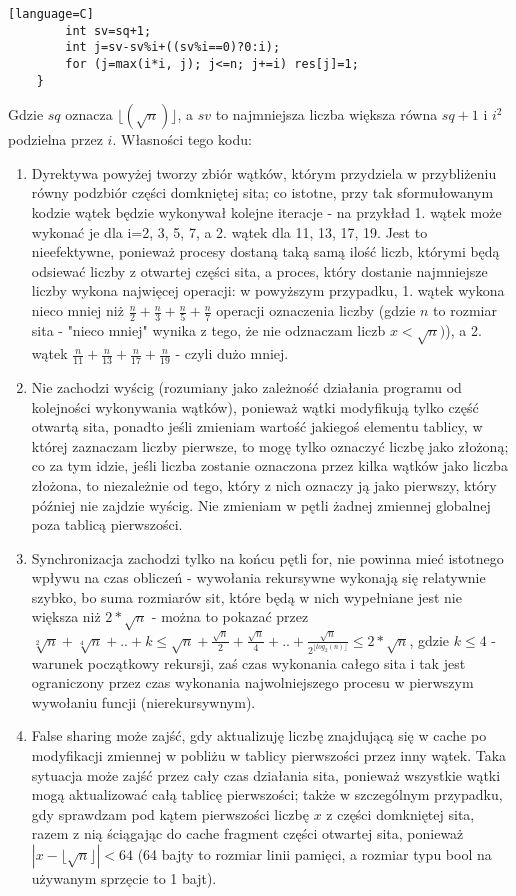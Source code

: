 \documentclass[12pt]{article}
\begin{document}
\begin {enumerate}
\begin{lstlisting}[style=mystyle, caption= Sito funkcyjne ze static schedulingiem][language=C]
		int sv=sq+1;
		int j=sv-sv%i+((sv%i==0)?0:i);
		for (j=max(i*i, j); j<=n; j+=i) res[j]=1;
	}
	\end{lstlisting}
	Gdzie \(sq\) oznacza \(\lfloor(\sqrt{n})\rfloor\), a \(sv\) to najmniejsza liczba większa równa \(sq+1\) i \(i^2\) podzielna przez \(i\). Własności tego kodu:
	\begin{enumerate}
		\item Dyrektywa powyżej tworzy zbiór wątków, którym przydziela w przybliżeniu równy podzbiór części domkniętej sita; co istotne, przy tak sformułowanym kodzie wątek będzie wykonywał kolejne iteracje - na przykład 1. wątek może wykonać je dla i=2, 3, 5, 7, a 2. wątek dla 11, 13, 17, 19. Jest to nieefektywne, ponieważ procesy dostaną taką samą ilość liczb, którymi będą odsiewać liczby z otwartej części sita, a proces, który dostanie najmniejsze liczby wykona najwięcej operacji: w powyższym przypadku, 1. wątek wykona nieco mniej niż \(\frac{n}{2}+\frac{n}{3}+\frac{n}{5}+\frac{n}{7}\) operacji oznaczenia liczby (gdzie \(n\) to rozmiar sita - "nieco mniej" wynika z tego, że nie odznaczam liczb \(x<\sqrt{n})\)), a 2. wątek \(\frac{n}{11}+\frac{n}{13}+\frac{n}{17}+\frac{n}{19}\) - czyli dużo mniej.
		\item Nie zachodzi wyścig (rozumiany jako zależność działania programu od kolejności wykonywania wątków), ponieważ wątki modyfikują tylko część otwartą sita, ponadto jeśli zmieniam wartość jakiegoś elementu tablicy, w której zaznaczam liczby pierwsze, to mogę tylko oznaczyć liczbę jako złożoną; co za tym idzie, jeśli liczba zostanie oznaczona przez kilka wątków jako liczba złożona, to niezależnie od tego, który z nich oznaczy ją jako pierwszy, który później nie zajdzie wyścig. Nie zmieniam w pętli żadnej zmiennej globalnej poza tablicą pierwszości.
		\item Synchronizacja zachodzi tylko na końcu pętli for, nie powinna mieć istotnego wpływu na czas obliczeń - wywołania rekursywne wykonają się relatywnie szybko, bo suma rozmiarów sit, które będą w nich wypełniane jest nie większa niż \(2*\sqrt{n}\) - można to pokazać przez \(\sqrt[2]{n}+\sqrt[4]{n}+..+k\le\sqrt{n}+\frac{\sqrt{n}}{2}+\frac{\sqrt{n}}{4}+..+\frac{\sqrt{n}}{2^{\lfloor log_2(n) \rfloor}}\le 2*\sqrt{n}\), gdzie \(k \le 4\) - warunek początkowy rekursji, zaś czas wykonania całego sita i tak jest ograniczony przez czas wykonania najwolniejszego procesu w pierwszym wywołaniu funcji (nierekursywnym).
		\item False sharing może zajść, gdy aktualizuję liczbę znajdującą się w cache po modyfikacji zmiennej w pobliżu w tablicy pierwszości przez inny wątek. Taka sytuacja może zajść przez cały czas działania sita, ponieważ wszystkie wątki mogą aktualizować całą tablicę pierwszości; także w szczególnym przypadku, gdy sprawdzam pod kątem pierwszości liczbę \(x\) z części domkniętej sita, razem z nią ściągając do cache fragment części otwartej sita, ponieważ \(|x-\lfloor\sqrt{n}\rfloor|<64\) (64 bajty to rozmiar linii pamięci, a rozmiar typu bool na używanym sprzęcie to 1 bajt).

\end{enumerate}
\end{enumerate}
\end{document}
